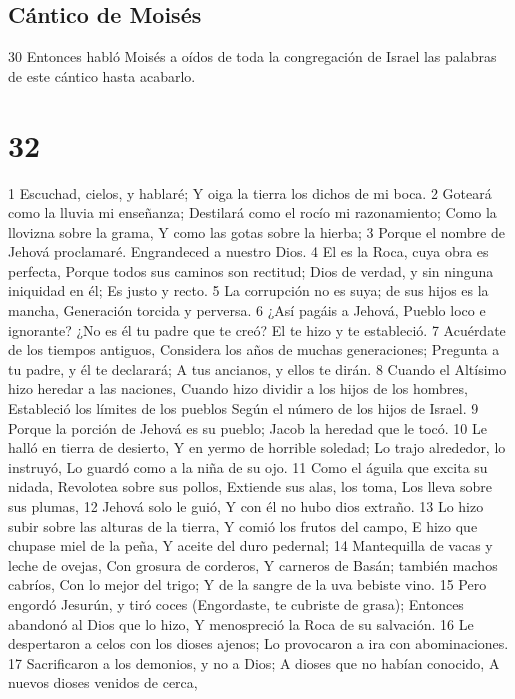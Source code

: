 \section{Cántico de Moisés}

30 Entonces habló Moisés a oídos de toda la congregación de Israel las palabras de este cántico hasta acabarlo.

\chapter{32}

1 Escuchad, cielos, y hablaré;
Y oiga la tierra los dichos de mi boca. 
2 Goteará como la lluvia mi enseñanza; 
Destilará como el rocío mi razonamiento;
Como la llovizna sobre la grama,
Y como las gotas sobre la hierba;
3 Porque el nombre de Jehová proclamaré.
Engrandeced a nuestro Dios.
4 El es la Roca, cuya obra es perfecta,
Porque todos sus caminos son rectitud;
Dios de verdad, y sin ninguna iniquidad en él;
Es justo y recto.
5 La corrupción no es suya; de sus hijos es la mancha,
Generación torcida y perversa.
6 ¿Así pagáis a Jehová,
Pueblo loco e ignorante?
¿No es él tu padre que te creó?
El te hizo y te estableció.
7 Acuérdate de los tiempos antiguos,
Considera los años de muchas generaciones;
Pregunta a tu padre, y él te declarará;
A tus ancianos, y ellos te dirán. 
8 Cuando el Altísimo hizo heredar a las naciones,
Cuando hizo dividir a los hijos de los hombres,
Estableció los límites de los pueblos
Según el número de los hijos de Israel.
9 Porque la porción de Jehová es su pueblo;
 Jacob la heredad que le tocó.
10 Le halló en tierra de desierto,
Y en yermo de horrible soledad;
Lo trajo alrededor, lo instruyó,
Lo guardó como a la niña de su ojo.
11 Como el águila que excita su nidada,
Revolotea sobre sus pollos,
Extiende sus alas, los toma,
Los lleva sobre sus plumas, 
12 Jehová solo le guió,
Y con él no hubo dios extraño.
13 Lo hizo subir sobre las alturas de la tierra,
Y comió los frutos del campo,
E hizo que chupase miel de la peña,
Y aceite del duro pedernal;
14 Mantequilla de vacas y leche de ovejas,
Con grosura de corderos, 
Y carneros de Basán; también machos cabríos,
Con lo mejor del trigo;
Y de la sangre de la uva bebiste vino.
15 Pero engordó Jesurún, y tiró coces
(Engordaste, te cubriste de grasa);
Entonces abandonó al Dios que lo hizo,
Y menospreció la Roca de su salvación. 
16 Le despertaron a celos con los dioses ajenos;
Lo provocaron a ira con abominaciones. 
17 Sacrificaron a los demonios, y no a Dios; 
A dioses que no habían conocido,
A nuevos dioses venidos de cerca,
